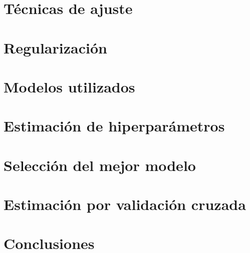 \section{Técnicas de ajuste}

\section{Regularización}

\section{Modelos utilizados}

\section{Estimación de hiperparámetros}

\section{Selección del mejor modelo}

\section{Estimación por validación cruzada}

\section{Conclusiones}
